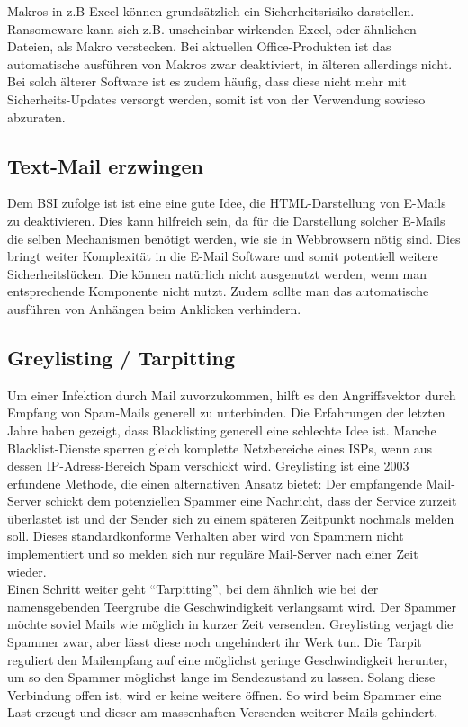 	Makros in z.B Excel können grundsätzlich ein Sicherheitsrisiko darstellen. Ransomeware kann sich z.B. unscheinbar wirkenden Excel, oder ähnlichen Dateien, als Makro verstecken. Bei aktuellen Office-Produkten ist das automatische ausführen von Makros zwar deaktiviert, in älteren allerdings nicht. Bei solch älterer Software ist es zudem häufig, dass diese nicht mehr mit Sicherheits-Updates versorgt werden, somit ist von der Verwendung sowieso abzuraten. 
	
\subsection{Text-Mail erzwingen}

	Dem BSI zufolge ist ist eine eine gute Idee, die HTML-Darstellung von E-Mails zu deaktivieren. Dies kann hilfreich sein, da für die Darstellung solcher E-Mails die selben Mechanismen benötigt werden, wie sie in Webbrowsern nötig sind. Dies bringt weiter Komplexität in die E-Mail Software und somit potentiell weitere Sicherheitslücken. Die können natürlich nicht ausgenutzt werden, wenn man entsprechende Komponente nicht nutzt. Zudem sollte man das automatische ausführen von Anhängen beim Anklicken verhindern\cite{bsi:ransome}.
	
	
\subsection{Greylisting / Tarpitting}
	
	Um einer Infektion durch Mail zuvorzukommen, hilft es den Angriffsvektor durch Empfang von Spam-Mails generell zu unterbinden. Die Erfahrungen der letzten Jahre haben gezeigt, dass Blacklisting generell eine schlechte Idee ist. Manche Blacklist-Dienste sperren gleich komplette Netzbereiche eines ISPs, wenn aus dessen IP-Adress-Bereich Spam verschickt wird. Greylisting ist eine 2003 erfundene Methode, die einen alternativen Ansatz bietet: Der empfangende Mail-Server schickt dem potenziellen Spammer eine Nachricht, dass der Service zurzeit überlastet ist und der Sender sich zu einem späteren Zeitpunkt nochmals melden soll. Dieses standardkonforme Verhalten aber wird von Spammern nicht implementiert und so melden sich nur reguläre Mail-Server nach einer Zeit wieder\cite{greylisting}. \\
	Einen Schritt weiter geht ``Tarpitting'', bei dem ähnlich wie bei der namensgebenden Teergrube die Geschwindigkeit verlangsamt wird. Der Spammer möchte soviel Mails wie möglich in kurzer Zeit versenden. Greylisting verjagt die Spammer zwar, aber lässt diese noch ungehindert ihr Werk tun. Die Tarpit reguliert den Mailempfang auf eine möglichst geringe Geschwindigkeit herunter, um so den Spammer möglichst lange im Sendezustand zu lassen. Solang diese Verbindung offen ist, wird er keine weitere öffnen. So wird beim Spammer eine Last erzeugt und dieser am massenhaften Versenden weiterer Mails gehindert.
	
